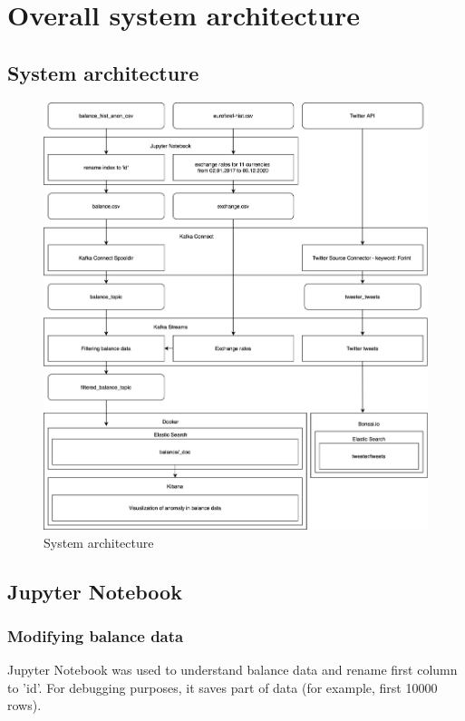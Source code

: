 \documentclass{article}
\begin{document}
\newpage
\section{Overall system architecture}
\subsection{System architecture}

\begin{figure}[h!]
\centering
\includegraphics[scale=0.115]{architecture.png}
\caption{System architecture}
\label{fig:universe}
\end{figure}

\newpage
\subsection{Jupyter Notebook}
\subsubsection{Modifying balance data}

Jupyter Notebook was used to understand balance data and rename first column to 'id'. For debugging purposes, it saves part of data (for example, first 10000 rows).
\end{document}

